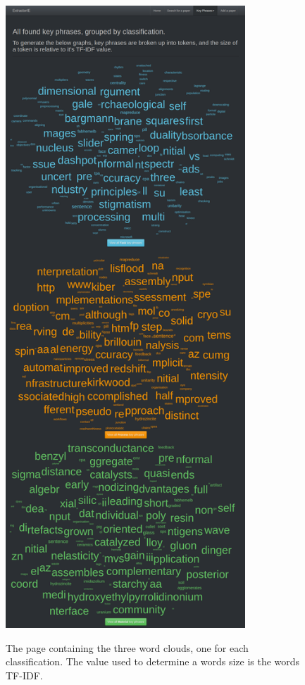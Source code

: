 \begin{figure}
	\centering
	\includegraphics[width=9cm]{img/extractorie-kp.png} \\
	\caption[The home page of the website]{The page containing the three word clouds, one for each classification. The value used to determine a words size is the words TF-IDF.}
	\label{figure:extractoriecloud}
\end{figure}

